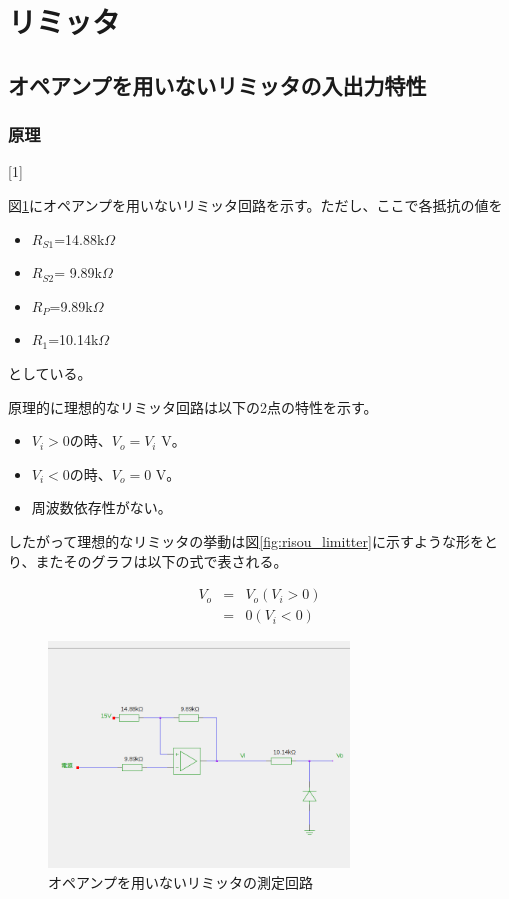 \documentclass[11pt,a4j]{jsarticle}
\begin{document}
 \section{リミッタ}
  \subsection{オペアンプを用いないリミッタの入出力特性}
   \subsubsection{原理}[1]
    
    図\ref{fig:noamp_tokusei}にオペアンプを用いないリミッタ回路を示す。ただし、ここで各抵抗の値を
    \begin{itemize}
    \item $R_{S1}$=14.88k$\Omega$
    \item $R_{S2}$= 9.89k$\Omega$
    \item $R_{P}$=9.89k$\Omega$
    \item $R_{1}$=10.14k$\Omega$
    \end{itemize}
    としている。
    
    
    原理的に理想的なリミッタ回路は以下の2点の特性を示す。
    \begin{itemize}
    \item $V_i > 0$の時、$V_o = V_i$ V。
    \item $V_i < 0$の時、$V_o = 0$ V。
    \item 周波数依存性がない。
    \end{itemize}
    したがって理想的なリミッタの挙動は図\ref{fig:risou_limitter}に示すような形をとり、またそのグラフは以下の式で表される。
    
    \begin{eqnarray}
    V_o &=& V_o (V_i >0) \\
            &=& 0 (V_i < 0)
    \end{eqnarray}
    
    
    
    \begin{figure}[htbp]
  \centering
  \includegraphics[width=8cm,clip]{noamp_tokusei.png}
  \caption{オペアンプを用いないリミッタの測定回路}
  \label{fig:noamp_tokusei}
 \end{figure}%
    
\end{document}
